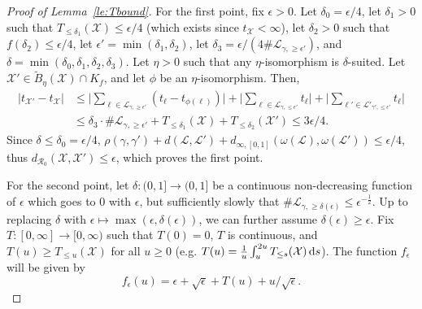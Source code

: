 \documentclass[11pt]{article}
\def\d{\,{\rm d}}
\def\Conf{{\mathscr{R}}}
\begin{document}
\begin{proof}[Proof of Lemma~\ref{le:Tbound}]
  For the first point, fix $\epsilon>0$. Let $\delta_0=\epsilon/4$, let  $\delta_1>0$ such that $T_{\leq\delta_1}(\mathcal{X})\leq \epsilon/4$ (which exists since $t_{\mathcal{X}}<\infty$), let $\delta_2>0$ such that $f(\delta_2)\leq \epsilon/4$, let $\epsilon'=\min(\delta_1,\delta_2)$,
  let $\delta_3 = \epsilon/ (4 \#\mathcal{L}_{\gamma,\geq \epsilon'}  )$, and $\delta=\min(\delta_0,\delta_1,\delta_2,\delta_3)$. Let $\eta>0$ such that any $\eta$-isomorphism is $\delta$-suited.
  Let $\mathcal{X}'\in \tilde{B}_{\eta}(\mathcal{X})\cap K_f$, and let $ \phi$ be an $\eta$-isomorphism. Then,
  \begin{align*}
  |t_{\mathcal{X}'}-t_{\mathcal{X}}|&\leq
  \Big|\sum_{\ell \in \mathcal{L}_{\gamma, \geq \epsilon'}} (t_\ell -t_{\phi(\ell)})\Big|+ \Big|\sum_{\ell \in \mathcal{L}_{\gamma, \leq \epsilon'}} t_\ell \Big|
  + \Big|\sum_{\ell' \in \mathcal{L}'_{\gamma', \leq \epsilon'}} t_\ell \Big|\\
  &\leq \delta_3 \cdot \#\mathcal{L}_{\gamma,\geq \epsilon'} + T_{\leq \delta_1}(\mathcal{X})+ T_{\leq \delta_2}(\mathcal{X}')\leq 3\epsilon/4.
  \end{align*}
  Since $\delta\leq \delta_0=\epsilon/4$,
  $\rho(\gamma,\gamma')+
  d( \mathcal{L},\mathcal{L}'  )+d_{\infty,[0,1]}(\omega(\mathcal{L}),\omega(\mathcal{L}') )\leq \epsilon/4$, thus $d_{\Conf_0}(\mathcal{X},\mathcal{X}' )\leq \epsilon$, which proves the first point.

  For the second point, let $\delta:(0,1]\to (0,1]$ be a continuous non-decreasing function of $\epsilon$ which goes to $0$ with $\epsilon$, but sufficiently slowly that $\# \mathcal{L}_{\gamma, \geq \delta(\epsilon) }\leq \epsilon^{-\frac{1}{2}}$. Up to replacing $\delta$ with $\epsilon\mapsto \max(\epsilon,\delta(\epsilon))$, we can further assume $\delta(\epsilon)\geq \epsilon$. Fix $T:[0,\infty]\to [0,\infty)$ such that $T(0)=0$, $T$ is continuous, and $T(u)\geq T_{\leq u}(\mathcal{X})$ for all $u\geq 0$ (e.g. $T(u)=\frac{1}{u}\int_u^{2u} T_{\leq s}(\mathcal{X})\d s $).
  The function $f_\epsilon$ will be given by
  \[
  f_\epsilon(u)=\epsilon+\sqrt{\epsilon}+T(u)+u/\sqrt{\epsilon}.
  \]


\end{proof}
\end{document}
